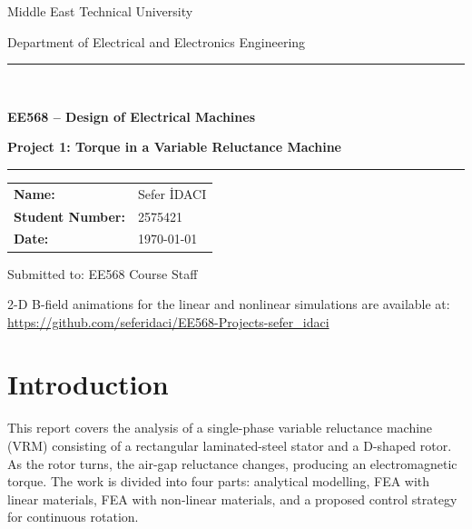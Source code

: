 \documentclass[12pt,a4paper]{article}
\begin{document}
\begin{titlepage}
  \centering
  \vspace*{3cm}
  {\Large Middle East Technical University \par}
  \vspace{0.4cm}
  {\large Department of Electrical and Electronics Engineering \par}
  \vspace{3cm}
  \rule{\linewidth}{0.5pt}\\[0.5cm]
  {\LARGE\bfseries EE568 -- Design of Electrical Machines \par}
  \vspace{0.4cm}
  {\Large\bfseries Project 1: Torque in a Variable Reluctance Machine \par}
  \rule{\linewidth}{0.5pt}
  \vspace{2cm}

  \begin{tabular}{ll}
    \textbf{Name:}           & Sefer \.{I}DACI \\[6pt]
    \textbf{Student Number:} & 2575421             \\[6pt]
    \textbf{Date:}           & \today              \\
  \end{tabular}

  \vfill
  {\small Submitted to: EE568 Course Staff}
\end{titlepage}

\begin{center}
  \small
  2-D B-field animations for the linear and nonlinear simulations are
  available at:\\[4pt]
  \url{https://github.com/seferidaci/EE568-Projects-sefer_idaci}
\end{center}

\vspace{4pt}

\section{Introduction}

This report covers the analysis of a single-phase variable reluctance
machine (VRM) consisting of a rectangular laminated-steel stator and a
D-shaped rotor. As the rotor turns, the air-gap reluctance changes,
producing an electromagnetic torque. The work is divided into four
parts: analytical modelling, FEA with linear materials, FEA with
non-linear materials, and a proposed control strategy for continuous
rotation.
\end{document}
